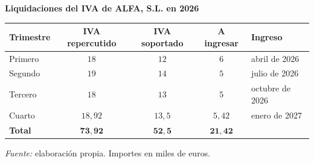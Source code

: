 \documentclass[10pt,a4paper]{article}
\begin{document}
\begin{center}\begin{minipage}{\linewidth}\centering
{\small\textbf{Liquidaciones del IVA de ALFA, S.L. en 2026}}\par\vspace{0.3em}
{\small
\begin{tabular}{l c c c l}
\hline
\textbf{Trimestre} & \textbf{IVA repercutido} & \textbf{IVA soportado} & \textbf{A ingresar} & \textbf{Ingreso} \\
\hline
Primero & $18$ & $12$ & $6$ & abril de 2026 \\
Segundo & $19$ & $14$ & $5$ & julio de 2026 \\
Tercero & $18$ & $13$ & $5$ & octubre de 2026 \\
Cuarto & $18,92$ & $13,5$ & $5,42$ & enero de 2027 \\
\hline
\textbf{Total} & $\mathbf{73,92}$ & $\mathbf{52,5}$ & $\mathbf{21,42}$ & \\
\hline
\end{tabular}}\par\vspace{0.3em}
{\small\textit{Fuente: }elaboración propia. Importes en miles de euros.}
\end{minipage}\end{center}
\end{document}
